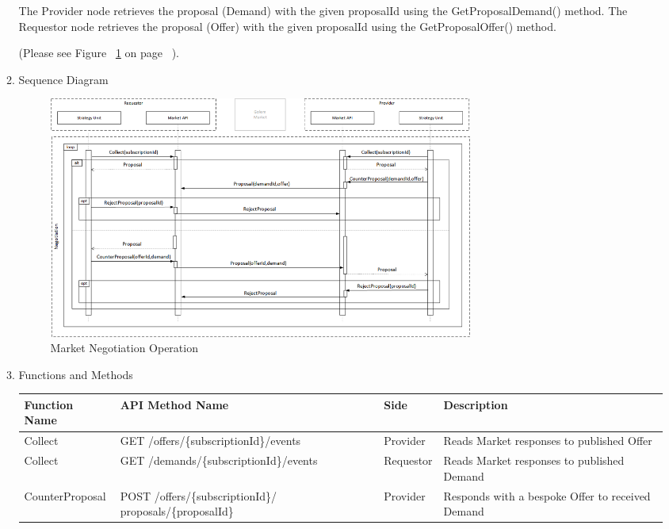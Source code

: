 \begin{enumerate}
\begin{enumerate}
The Provider node retrieves the proposal (Demand) with the given proposalId using the GetProposalDemand() method. 
The Requestor node retrieves the proposal (Offer) with the given proposalId using the GetProposalOffer() method.

(Please see Figure ~\ref{fig:MNO} on page ~\pageref{fig:MNO}).

\item Sequence Diagram

\begin{figure}[H]
    \centering
    \includegraphics[width=14cm,angle=0]{./diag/Sequence/MarketNegotiation-B-Sequence.png}
	\caption{Market Negotiation Operation}
    \label{fig:MNO}
\end{figure}

\item Functions and Methods

\begin{table}[H]
\footnotesize

\begin{center}
\begin{tabular}{|p{3cm}|p{7cm}|p{1.5cm}|p{4cm}|} 
\hline
\rowcolor{lightgray}	Function Name	& API Method Name	& 	Side	&	Description \\
\hline

Collect			&	GET /offers/\{subscriptionId\}/events	&	Provider	&	Reads Market responses to published Offer \\
\hline

Collect			&	GET /demands/\{subscriptionId\}/events	&	Requestor	&	Reads Market responses to published Demand \\
\hline

CounterProposal	&	POST /offers/\{subscriptionId\}/ \newline proposals/\{proposalId\}	&	Provider	&	Responds with a bespoke Offer to received Demand \\
\hline


\end{tabular}
\end{center}
\end{table}
\end{enumerate}
\end{enumerate}
